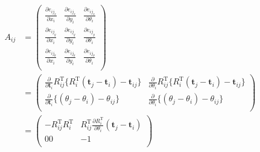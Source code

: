 \documentclass{article}
\begin{document}
\[
\begin{align}
A_{ij} &=
\left(
  \begin{array}{ccc}
    \frac{\partial e_{ij_x}}{\partial x_i} & \frac{\partial e_{ij_x}}{\partial y_i} & \frac{\partial e_{ij_x}}{\partial \theta_i} \\
    \frac{\partial e_{ij_y}}{\partial x_i} & \frac{\partial e_{ij_y}}{\partial y_i} & \frac{\partial e_{ij_y}}{\partial \theta_i} \\
    \frac{\partial e_{ij_\theta}}{\partial x_i} & \frac{\partial e_{ij_\theta}}{\partial y_i} & \frac{\partial e_{ij_\theta}}{\partial \theta_i} \\
  \end{array}
\right) \\ &=
\left(
  \begin{array}{ccc}
    \frac{\partial }{\partial \bm{t}_i} R_{ij}^{\mathrm{T}}\{R_i^{\mathrm{T}}(\bm{t}_j-\bm{t}_i)-\bm{t}_{ij}\} & \frac{\partial }{\partial \theta_i} R_{ij}^{\mathrm{T}}\{R_i^{\mathrm{T}}(\bm{t}_j-\bm{t}_i)-\bm{t}_{ij}\} \\
                                         \frac{\partial }{\partial \bm{t}_i} \{(\theta_j - \theta_i) - \theta_{ij}\} & \frac{\partial }{\partial \theta_i} \{(\theta_j - \theta_i) - \theta_{ij}\} \\
  \end{array}
\right) \\ &=
\left(
  \begin{array}{ccc}
    -R_{ij}^{\mathrm{T}} R_i^{\mathrm{T}} & R_{ij}^{\mathrm{T}} \frac{\partial R_i^{\mathrm{T}}}{\partial \theta_i}(\bm{t}_j-\bm{t}_i) \\
                                       00 &                                                                                             -1 \\
  \end{array}
\right) \\
\end{align}
\]
\end{document}
